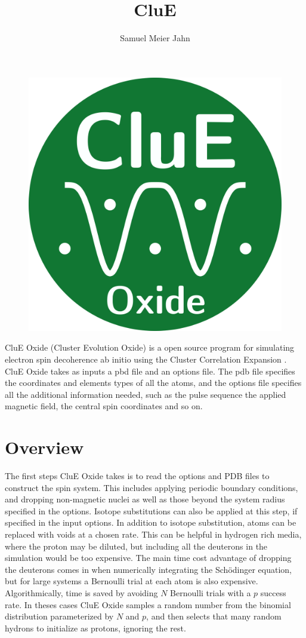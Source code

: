 \documentclass{book}
\title{CluE}
\author{Samuel Meier Jahn}
\begin{document}
%
\begin{figure} [H]
	\centering
	\includegraphics[width=0.5\linewidth]{figs/fig_CluE_Oxide_logo.png}
  \label{fig:clue_logo}
\end{figure}
%
CluE Oxide (Cluster Evolution Oxide) is a open source program for simulating 
electron spin decoherence ab initio using the Cluster Correlation Expansion 
\cite{2008_Yang_Liu,2009_Yang_Liu}.  
CluE Oxide takes as inputs a pbd file and an options file.
The pdb file specifies the coordinates and elements types of all the atoms, 
and the options file specifies all the additional information needed, 
such as the pulse sequence the applied magnetic field, the central spin
coordinates and so on.
\section{Overview}
The first steps CluE Oxide takes is to read the options and PDB files to construct
the spin system.  This includes applying periodic boundary conditions, and
dropping non-magnetic nuclei as well as those beyond the system radius 
specified in the options.  Isotope substitutions can also be applied at this
step, if specified in the input options.  In addition to isotope substitution,
atoms can be replaced with voids at a chosen rate.  
This can be helpful in hydrogen rich media,
where the proton may be diluted, but including all the deuterons in the
simulation would be too expensive.  The main time cost advantage of dropping 
the deuterons comes in when numerically integrating the Sch{\"o}dinger 
equation, but for large systems a Bernoulli trial at each atom is also
expensive.  Algorithmically, time is saved by avoiding $N$ Bernoulli trials
with a $p$ success rate.  In theses cases CluE Oxide samples a random
number from the binomial distribution parameterized by $N$ and $p$, and then 
selects that many random hydrons to initialize as protons, ignoring the rest.     
\end{document}
